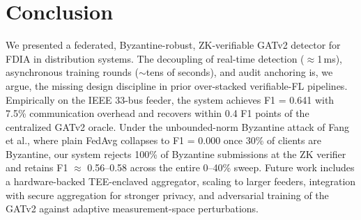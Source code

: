 \documentclass[conference]{IEEEtran}
\begin{document}
\section{Conclusion}
\label{sec:conc}
We presented a federated, Byzantine-robust, ZK-verifiable GATv2 detector for FDIA in distribution systems. The decoupling of real-time detection ($\approx$1\,ms), asynchronous training rounds ($\sim$tens of seconds), and audit anchoring is, we argue, the missing design discipline in prior over-stacked verifiable-FL pipelines. Empirically on the IEEE 33-bus feeder, the system achieves F1 = 0.641 with 7.5\% communication overhead and recovers within 0.4 F1 points of the centralized GATv2 oracle. Under the unbounded-norm Byzantine attack of Fang et al., where plain FedAvg collapses to F1 = 0.000 once 30\% of clients are Byzantine, our system rejects 100\% of Byzantine submissions at the ZK verifier and retains F1 $\approx$ 0.56--0.58 across the entire 0--40\% sweep. Future work includes a hardware-backed TEE-enclaved aggregator, scaling to larger feeders, integration with secure aggregation for stronger privacy, and adversarial training of the GATv2 against adaptive measurement-space perturbations.



\end{document}
